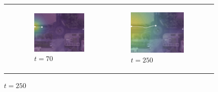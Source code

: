 \documentclass[letterpaper,10pt,conference]{ieeeconf}
\begin{document}
\begin{figure}
\begin{tabular}{M{.1\linewidth}  M{.3\linewidth} M{.3\linewidth}  M{.3\linewidth}}
	 & 
	\begin{subfigure}[b]{\linewidth}
		\includegraphics[width=\linewidth]{./figures/comparison/rand_death_1_2_t=70.png}
		\caption{$t=70$}
	\end{subfigure}&
	\begin{subfigure}[b]{\linewidth}  \includegraphics[width=\linewidth]{./figures/comparison/rand_death_1_2_t=250.png}
		\caption{$t=250$}
	\end{subfigure}&

\end{tabular}
\end{figure}
\end{document}
